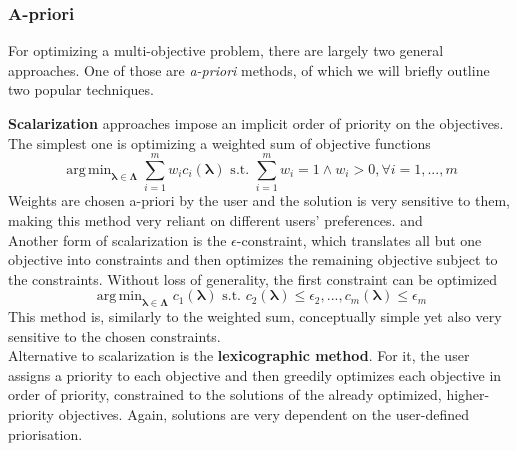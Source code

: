 \documentclass[twoside,11pt]{article}
\DeclareMathOperator*{\argmin}{arg\,min}
\begin{document}
\subsubsection{A-priori}
For optimizing a multi-objective problem, there are largely two general approaches.
One of those are \textit{a-priori} methods, of which we will briefly outline two popular techniques.

\textbf{Scalarization} approaches impose an implicit order of priority on the objectives.
The simplest one is optimizing a weighted sum of objective functions
\begin{equation}
  \argmin_{\boldsymbol\lambda\in\boldsymbol\Lambda} \sum_{i=1}^m w_i c_i(\boldsymbol\lambda)
  \text{ s.t. } \sum_{i=1}^m w_i=1 \wedge w_i>0,\forall i=1,...,m
  \label{eq-a-priori-scalarization-weighted-sum}
\end{equation}
Weights are chosen a-priori by the user and the solution is very sensitive to them, making this method very reliant on different
users' preferences. \citep[p. 11]{10.1145/3610536} and \citep[pp. 223f]{NSGA}
\\
Another form of scalarization is the $\epsilon$-constraint, which translates all but one objective into constraints and then optimizes the remaining
objective subject to the constraints. Without loss of generality, the first constraint can be optimized
\begin{equation}
  \argmin_{\boldsymbol\lambda\in\boldsymbol\Lambda} c_1(\boldsymbol\lambda)
  \text{ s.t. } c_2(\boldsymbol\lambda)\le\epsilon_2,...,c_m(\boldsymbol\lambda)\le\epsilon_m
  \label{eq-a-priori-scalarization-epsilon}
\end{equation}
This method is, similarly to the weighted sum, conceptually simple yet also very sensitive to the chosen constraints. \citep[p. 12]{10.1145/3610536}
\\
Alternative to scalarization is the \textbf{lexicographic method}.
For it, the user assigns a priority to each objective and then greedily optimizes each objective in order of priority, constrained to the solutions of
the already optimized, higher-priority objectives. \citep[p. 13749]{lexicographic_MOO}
Again, solutions are very dependent on the user-defined priorisation.
\end{document}
